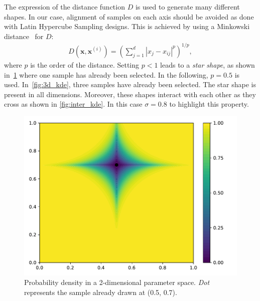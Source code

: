 The expression of the distance function $D$ is used to generate many different shapes. In our case, alignment of samples on each axis should be avoided as done with Latin Hypercube Sampling designs. This is achieved by using a Minkowski distance~\citep{Cha2007} for $D$:
\begin{align}
D\left(\mathbf{x},\mathbf{x}^{(i)}\right)=\left(\sum_{j=1}^d |x_{j}-x_{ij}|^p\right)^{1/p},
\end{align}
where $p$ is the order of the distance. Setting $p < 1$ leads to a \emph{star shape}, as shown in~\cref{fig:minkowsky} where one sample has already been selected. In the following, $p=0.5$ is used. In~\cref{fig:3d_kde}, three samples have already been selected. The star shape is present in all dimensions. Moreover, these shapes interact with each other as they cross as shown in \cref{fig:inter_kde}. In this case $\sigma=0.8$ to highlight this property.

\cleardoublepage

\begin{figure}[!h]               
\centering
\includegraphics[width=0.7\linewidth,height=\textheight,keepaspectratio]{fig/contributions/doe/inv_minkowsky.pdf}
\caption{Probability density in a 2-dimensional parameter space. \emph{Dot} represents the sample already drawn at (0.5, 0.7).}
 \label{fig:minkowsky}
\end{figure}


